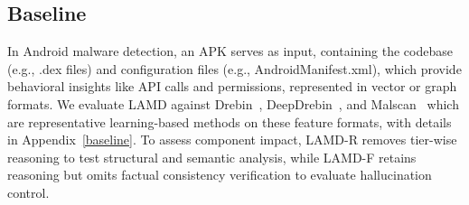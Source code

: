 



\subsection{Baseline}
In Android malware detection, an APK serves as input, containing the codebase (e.g., .dex files) and configuration files (e.g., AndroidManifest.xml), which provide behavioral insights like API calls and permissions, represented in vector or graph formats. We evaluate LAMD against Drebin~\cite{Arpdrebin}, DeepDrebin~\cite{Grossedeepdrebin}, and Malscan~\cite{malscan} which are representative learning-based methods on these feature formats, with details in Appendix~\ref{baseline}. To assess component impact, LAMD-R removes tier-wise reasoning to test structural and semantic analysis, while LAMD-F retains reasoning but omits factual consistency verification to evaluate hallucination control.




